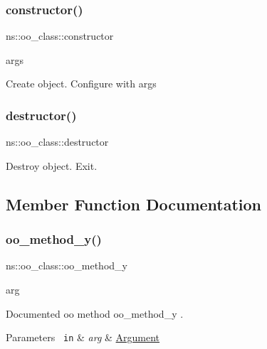 \subsubsection{\texorpdfstring{constructor()}{constructor()}}
{\footnotesize\ttfamily ns\+::oo\+\_\+class\+::constructor\begin{DoxyParamCaption}\item[{}]{args  }\end{DoxyParamCaption}}

Create object. Configure with args \mbox{\label{classns_1_1oo__class_af148cfc1c090a05986c68ac9452a510a}} 
\subsubsection{\texorpdfstring{destructor()}{destructor()}}
{\footnotesize\ttfamily ns\+::oo\+\_\+class\+::destructor}

Destroy object. Exit. 

\subsection{Member Function Documentation}
\mbox{\label{classns_1_1oo__class_ad07feb192f34010ed66d123338c7acdd}} 
\subsubsection{\texorpdfstring{oo\_method\_y()}{oo\_method\_y()}}
{\footnotesize\ttfamily ns\+::oo\+\_\+class\+::oo\+\_\+method\+\_\+y\begin{DoxyParamCaption}\item[{}]{arg  }\end{DoxyParamCaption}\hspace{0.3cm}{\ttfamily [protected]}}

Documented oo method {\ttfamily oo\+\_\+method\+\_\+y} . 
\begin{DoxyParams}[1]{Parameters}
\mbox{\texttt{ in}}  & {\em arg} & \mbox{\hyperlink{struct_argument}{Argument}} \\
\hline
\end{DoxyParams}
\mbox{\label{classns_1_1oo__class_a8a3cfbae3b3fca463f08adb9174a5fe8}} 
